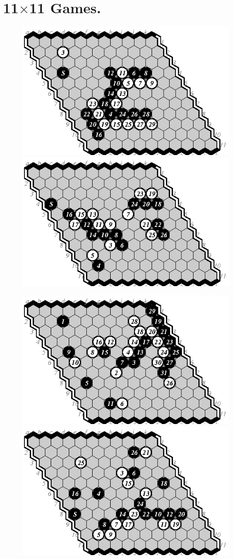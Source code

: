 \documentclass{IOS-Book-Article}
\begin{document}
\section{11$\times$11 Games.}
\begin{figure}
\noindent\includegraphics[width=.58\columnwidth]{pix/11-01-me}\hspace*{-.14\columnwidth}\includegraphics[width=.58\columnwidth]{pix/11-02-em}
\vspace*{.2cm}

\noindent\includegraphics[width=.58\columnwidth]{pix/11-03-me}\hspace*{-.14\columnwidth}\includegraphics[width=.58\columnwidth]{pix/11-04-em}
\vspace*{.2cm}


\end{figure}
\end{document}
